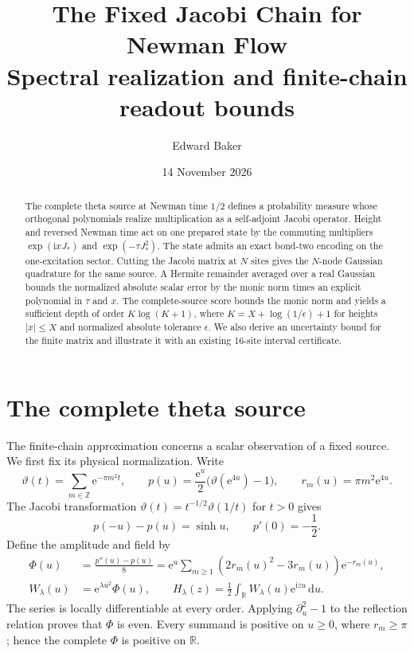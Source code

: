 \documentclass[11pt]{article}
\title{The Fixed Jacobi Chain for Newman Flow\\
\large Spectral realization and finite-chain readout bounds}
\author{Edward Baker}
\date{14 November 2026}
\numberwithin{equation}{section}
\newcommand{\R}{\mathbb R}
\newcommand{\ee}{\mathrm e}
\newcommand{\ii}{\mathrm i}
\newcommand{\dd}{\,\mathrm d}
\begin{document}
\maketitle

\begin{abstract}
The complete theta source at Newman time \(1/2\) defines a probability
measure whose orthogonal polynomials realize multiplication as a
self-adjoint Jacobi operator. Height and reversed Newman time act on
one prepared state by the commuting multipliers \(\exp(\ii xJ_*)\)
and \(\exp(-\tau J_*^2)\). The state admits an exact bond-two encoding
on the one-excitation sector. Cutting the Jacobi matrix at \(N\) sites
gives the \(N\)-node Gaussian quadrature for the same source. A Hermite
remainder averaged over a real Gaussian bounds the normalized
absolute scalar error by the monic norm times an explicit polynomial
in \(\tau\) and \(x\). The complete-source score bounds the monic norm
and yields a sufficient depth of order \(K\log(K+1)\), where
\(K=X+\log(1/\epsilon)+1\) for heights \(|x|\le X\) and normalized
absolute tolerance \(\epsilon\). We also derive an uncertainty bound
for the finite matrix and illustrate it with an existing 16-site
interval certificate.
\end{abstract}

\section{The complete theta source}\label{sec:source}

The finite-chain approximation concerns a scalar observation of a
fixed source. We first fix its physical normalization. Write
\[
 \vartheta(t)=\sum_{m\in\mathbb Z}\ee^{-\pi m^2t},\qquad
 p(u)=\frac{\ee^u}{2}\bigl(\vartheta(\ee^{4u})-1\bigr),\qquad
 r_m(u)=\pi m^2\ee^{4u}.
\]
The Jacobi transformation \(\vartheta(t)=t^{-1/2}\vartheta(1/t)\)
for \(t>0\) \cite{theta} gives
\[
 p(-u)-p(u)=\sinh u,\qquad p'(0)=-\frac12.
\]
Define the amplitude and field by
\begin{align}
 \Phi(u)&=\frac{p''(u)-p(u)}8
     =\ee^u\sum_{m\ge1}(2r_m(u)^2-3r_m(u))\ee^{-r_m(u)},
       \label{eq:source}\\
 W_\lambda(u)&=\ee^{\lambda u^2}\Phi(u),\qquad
 H_\lambda(z)=\frac12\int_{\R}W_\lambda(u)\ee^{\ii zu}\dd u.
       \label{eq:field}
\end{align}
The series is locally differentiable at every order. Applying
\(\partial_u^2-1\) to the reflection relation proves that \(\Phi\)
is even. Every summand is positive on \(u\ge0\), where \(r_m\ge\pi\);
hence the complete \(\Phi\) is positive on \(\R\).
\end{document}

